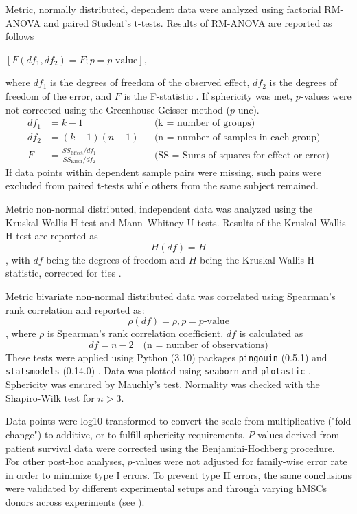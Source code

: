 Metric, normally distributed, dependent data were analyzed using factorial
RM-ANOVA and paired Student’s t-tests. Results of RM-ANOVA are reported as
follows
\begin{center}
    \([F(df_1, df_2) = F; p = p\text{-value}]\),
\end{center}
where \(df_1\) is the degrees of freedom of the observed effect, \(df_2\) is the
degrees of freedom of the error, and \(F\) is the F-statistic
\cite{vallatPingouinStatisticsPython2018}. If sphericity was met, \(p\)-values
were not corrected using the Greenhouse-Geisser method (\(p\)-unc).
\begin{align*}
    df_1 & = k - 1                                                      &  & \text{(k = number of groups)}                     \\
    df_2 & = (k - 1)(n - 1)                                             &  & \text{(n = number of samples in each group)}      \\
    F    & = \frac{SS_{\text{Effect}} / df_1}{SS_{\text{Error}} / df_2} &  & \text{(SS = Sums of squares for effect or error)}
\end{align*}
If data points within dependent sample pairs were missing, such pairs were
excluded from paired t-tests while others from the same subject remained.

Metric non-normal distributed, independent data was analyzed using the
Kruskal-Wallis H-test and Mann–Whitney U tests. Results of the Kruskal-Wallis
H-test are reported as
\[H(df) = H\], with \(df\) being the degrees of freedom
and \(H\) being the Kruskal-Wallis H statistic, corrected for ties
\cite{vallatPingouinStatisticsPython2018}.

Metric bivariate non-normal distributed data was correlated using Spearman’s
rank correlation and reported as: \[\rho (df) = \rho, p = p\text{-value}\],
where \(\rho\) is Spearman’s rank correlation coefficient. \(df\) is calculated
as
\[
    df = n - 2 \quad \text{(n = number of observations)}
\]
These tests were applied using Python (3.10) packages \texttt{pingouin} (0.5.1)
and \texttt{statsmodels} (0.14.0)
\cite{seaboldStatsmodelsEconometricStatistical2010,vallatPingouinStatisticsPython2018}. Data was plotted
using \texttt{seaborn} \cite{waskomSeabornStatisticalData2021} and \texttt{plotastic}
\cite{kuricPlotasticBridgingPlotting2024}. Sphericity was ensured by Mauchly’s
test. Normality was checked with the Shapiro-Wilk test for \(n > 3\).

Data points were log10 transformed to convert the scale from multiplicative
("fold change") to additive, or to fulfill sphericity requirements. \(P\)-values
derived from patient survival data were corrected using the Benjamini-Hochberg
procedure. For other post-hoc analyses, \(p\)-values were not adjusted for
family-wise error rate in order to minimize type I errors. To prevent type II
errors, the same conclusions were validated by different experimental setups and
through varying hMSCs donors across experiments (see ).

